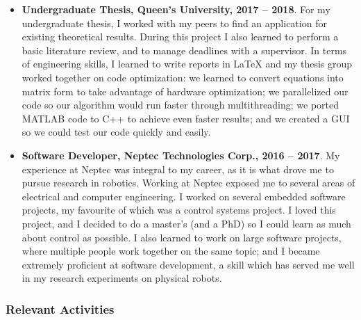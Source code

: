 \documentclass[a4paper,12pt]{article}
\begin{document}
\begin{itemize}
    \item \textbf{Undergraduate Thesis, Queen's University, 2017 -- 2018}.
        For my undergraduate thesis, I worked with my peers to find an
        application for existing theoretical results. 
        During this project I also learned to perform a basic literature review,
        and to manage deadlines with a supervisor.
        In terms of engineering skills, I learned to write reports in LaTeX
        and my thesis group worked together on code optimization: we learned to
        convert equations into matrix form to take advantage of hardware
        optimization; we parallelized our code so our algorithm would run faster
        through multithreading; we ported MATLAB code to C++ to achieve even
        faster results; and we created a GUI so we could test our code quickly
        and easily.

    \item \textbf{Software Developer, Neptec Technologies Corp., 2016 -- 2017}.
        My experience at Neptec was integral to my career, as it is what drove
        me to pursue research in robotics.
        Working at Neptec exposed me to several areas of electrical and computer
        engineering.
        I worked on several embedded software projects, my favourite of which
        was a control systems project.
        I loved this project, and I decided to do a master's (and a PhD) so I
        could learn as much about control as possible.
        I also learned to work on large software projects, where multiple people work
        together on the same topic; 
        and I became extremely proficient at software development, a skill which
        has served me well in my research experiments on physical robots.
        
\end{itemize}

\subsubsection*{Relevant Activities}
\end{document}
